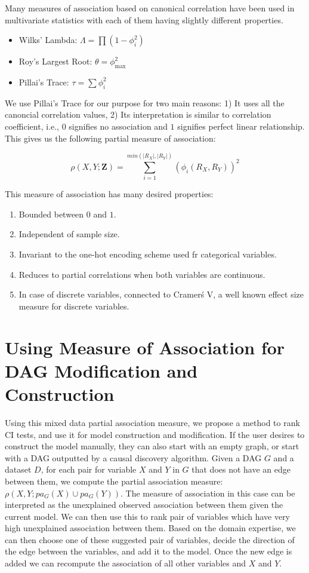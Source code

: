 \documentclass[letterpaper]{article} %
\begin{document}
Many measures of association based on canonical correlation have been used in
multivariate statistics with each of them having slightly different properties.
\begin{itemize}
	\item Wilks' Lambda: $ \Lambda = \prod (1 - \phi_i^2) $
	\item Roy's Largest Root: $ \theta = \phi_{\max}^2 $
	\item Pillai's Trace: $ \tau = \sum \phi_i^2 $
\end{itemize}

We use Pillai's Trace for our purpose for two main reasons: 1) It uses all the
canoncial correlation values, 2) Its interpretation is similar to correlation
coefficient, i.e., $ 0 $ signifies no association and $ 1 $ signifies perfect
linear relationship. This gives us the following partial measure of association:

$$ \rho(X, Y; \bm{Z}) = \sum_{i=1}^{min(\rvert R_X \rvert, \rvert R_Y \rvert)} (\phi_i(R_X, R_Y))^2 $$


This measure of association has many desired properties:

\begin{enumerate}
	\item Bounded between $ 0 $ and $ 1 $.
	\item Independent of sample size.
	\item Invariant to the one-hot encoding scheme used fr categorical variables.
	\item Reduces to partial correlations when both variables are continuous.
	\item In case of discrete variables, connected to Cramer\'s V, a well
		known effect size measure for discrete variables.
\end{enumerate}

\section{Using Measure of Association for DAG Modification and Construction}
\label{sec:modification}


Using this mixed data partial association measure, we propose a method to rank
CI tests, and use it for model construction and modification. If the user
desires to construct the model manually, they can also start with an empty
graph, or start with a DAG outputted by a causal discovery algorithm. Given a
DAG $ G $ and a dataset $ D $, for each pair for variable $ X $ and $ Y $ in $
G $ that does not have an edge between them, we compute the partial association
measure: $ \rho(X, Y; pa_G(X) \cup pa_G(Y)) $. The measure of association in
this case can be interpreted as the unexplained observed association between
them given the current model. We can then use this to rank pair of variables
which have very high unexplained association between them. Based on the domain
expertise, we can then choose one of these suggested pair of variables, decide
the direction of the edge between the variables, and add it to the model. Once
the new edge is added we can recompute the association of all other variables
and $ X $ and $ Y $.
\end{document}
